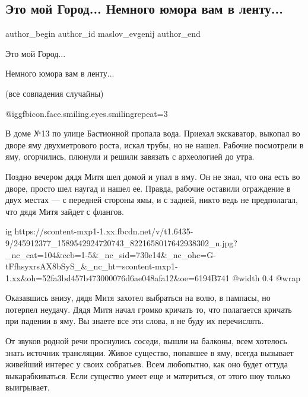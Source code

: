  
 
 
 
 
 
\subsection{Это мой Город... Немного юмора вам в ленту...}
\label{sec:18_10_2021.fb.maslov_evgenij.1.gorod_jumor}
 
\ifcmt
 author_begin
   author_id maslov_evgenij
 author_end
\fi

Это мой Город...

Немного юмора вам в ленту...

(все совпадения случайны)

@igg{fbicon.face.smiling.eyes.smiling}{repeat=3} 

В доме №13 по улице Бастионной пропала вода. Приехал экскаватор, выкопал во
дворе яму двухметрового роста, искал трубы, но не нашел. Рабочие посмотрели в
яму, огорчились, плюнули и решили завязать с археологией до утра.

Поздно вечером дядя Митя шел домой и упал в яму. Он не знал, что она есть во
дворе, просто шел наугад и нашел ее. Правда, рабочие оставили ограждение в двух
местах — с передней стороны ямы, и с задней, никто ведь не предполагал, что
дядя Митя зайдет с флангов.

\ifcmt
  ig https://scontent-mxp1-1.xx.fbcdn.net/v/t1.6435-9/245912377_1589542924720743_8221658017642938302_n.jpg?_nc_cat=104&ccb=1-5&_nc_sid=730e14&_nc_ohc=G-tFfhsyxrsAX8bSyS_&_nc_ht=scontent-mxp1-1.xx&oh=52fa3bd457b473000076d6ae048afa12&oe=6194B741
  @width 0.4
  @wrap 
\fi

Оказавшись внизу, дядя Митя захотел выбраться на волю, в пампасы, но потерпел
неудачу. Дядя Митя начал громко кричать то, что полагается кричать при падении
в яму. Вы знаете все эти слова, я не буду их перечислять.

От звуков родной речи проснулись соседи, вышли на балконы, всем хотелось знать
источник трансляции. Живое существо, попавшее в яму, всегда вызывает живейший
интерес у своих собратьев. Всем любопытно, как оно будет оттуда
выкарабкиваться. Если существо умеет еще и материться, от этого шоу только
выигрывает.

